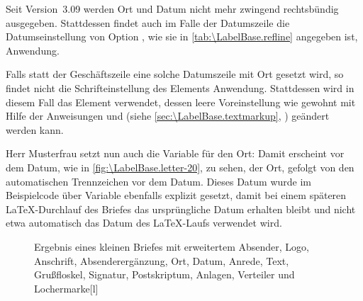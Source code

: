 Seit Version~3.09 werden Ort und Datum
nicht mehr zwingend rechtsbündig ausgegeben. Stattdessen findet auch im Falle
der Datumszeile die Datumseinstellung von Option
%
, wie sie in
\autoref{tab:\LabelBase.refline} angegeben ist, Anwendung.

\BeginIndexGroup
{}%
Falls statt der Geschäftszeile eine solche
Datumszeile mit Ort gesetzt wird, so findet nicht die Schrifteinstellung des
Elements  Anwendung. Stattdessen wird
in diesem Fall das Element
 verwendet,
dessen leere Voreinstellung wie gewohnt mit Hilfe der Anweisungen
 und
 (siehe
\autoref{sec:\LabelBase.textmarkup}, )
geändert werden kann.%
\EndIndexGroup

\begin{Example}
  Herr Musterfrau setzt nun auch die Variable für den Ort:
  Damit erscheint vor dem Datum, wie in \autoref{fig:\LabelBase.letter-20},
   zu sehen, der Ort, gefolgt von den
  automatischen Trennzeichen vor dem Datum. Dieses Datum wurde im Beispielcode
  über Variable  ebenfalls explizit gesetzt,
  damit bei einem späteren \LaTeX-Durchlauf des Briefes das ursprüngliche
  Datum erhalten bleibt und nicht etwa automatisch das Datum des \LaTeX-Laufs
  verwendet wird.
  \begin{figure}
    \setcapindent{0pt}%
    \begin{captionbeside}{Ergebnis eines kleinen Briefes mit erweitertem Absender,
        Logo, Anschrift, Absenderergänzung, Ort, Datum, Anrede,
        Text, Grußfloskel, Signatur, Postskriptum, Anlagen, Verteiler und
        Lochermarke}[l]
    \end{captionbeside}
    \label{fig:\LabelBase.letter-20}
  \end{figure}
\end{Example}
%
\EndIndexGroup
\EndIndexGroup
\EndIndexGroup


